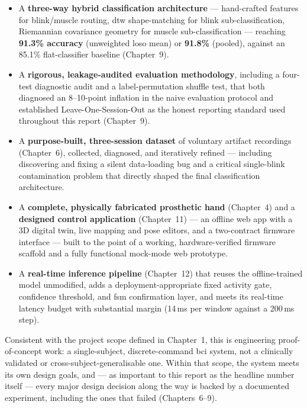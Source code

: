 \begin{itemize}[leftmargin=*]
    \item A \textbf{three-way hybrid classification architecture} ---
    hand-crafted features for blink/muscle routing, \acrshort{dtw}
    shape-matching for blink sub-classification, Riemannian
    covariance geometry for muscle sub-classification --- reaching
    \textbf{91.3\% accuracy} (unweighted \acrshort{loso} mean) or
    \textbf{91.8\%} (pooled), against an 85.1\% flat-classifier
    baseline (Chapter~9).
    \item A \textbf{rigorous, leakage-audited evaluation
    methodology}, including a four-test diagnostic audit and a
    label-permutation shuffle test, that both diagnosed an 8--10-point
    inflation in the naive evaluation protocol and established
    Leave-One-Session-Out as the honest reporting standard used
    throughout this report (Chapter~9).
    \item A \textbf{purpose-built, three-session dataset} of
    voluntary artifact recordings (Chapter~6), collected,
    diagnosed, and iteratively refined --- including discovering
    and fixing a silent data-loading bug and a critical single-blink
    contamination problem that directly shaped the final
    classification architecture.
    \item A \textbf{complete, physically fabricated prosthetic hand}
    (Chapter~4) and a \textbf{designed control application}
    (Chapter~11) --- an offline web app with a 3D digital twin,
    live mapping and pose editors, and a two-contract firmware
    interface --- built to the point of a working, hardware-verified
    firmware scaffold and a fully functional mock-mode web
    prototype.
    \item A \textbf{real-time inference pipeline} (Chapter~12) that
    reuses the offline-trained model unmodified, adds a
    deployment-appropriate fixed activity gate, confidence
    threshold, and \acrshort{fsm} confirmation layer, and meets its
    real-time latency budget with substantial margin (14\,ms per
    window against a 200\,ms step).
\end{itemize}

Consistent with the project scope defined in Chapter~1, this is
engineering proof-of-concept work: a single-subject,
discrete-command \acrshort{bci} system, not a clinically validated
or cross-subject-generalisable one. Within that scope, the system
meets its own design goals, and --- as important to this report as
the headline number itself --- every major design decision along
the way is backed by a documented experiment, including the ones
that failed (Chapters~6--9).

